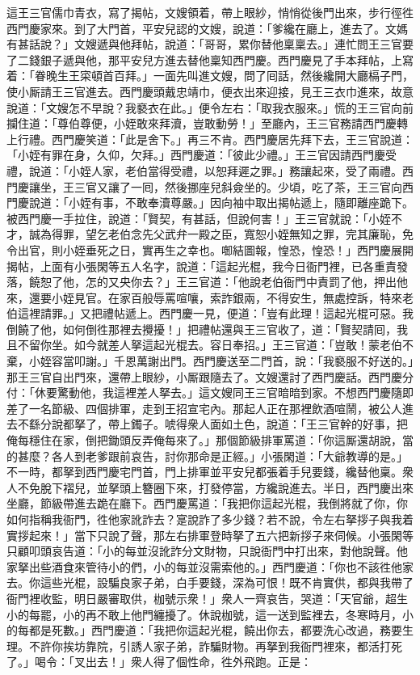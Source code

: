 這王三官儒巾青衣，寫了揭帖，文嫂領着，帶上眼紗，悄悄從後門出來，步行徑徃西門慶家來。到了大門首，平安兒認的文嫂，說道：「爹纔在廳上，進去了。文媽有甚話說？」文嫂遞與他拜帖，說道：「哥哥，累你替他稟稟去。」連忙問王三官要了二錢銀子遞與他，那平安兒方進去替他稟知西門慶。西門慶見了手本拜帖，上寫着：「眷晚生王寀頓首百拜。」一面先叫進文嫂，問了囘話，然後纔開大廳槅子門，使小厮請王三官進去。西門慶頭戴忠靖巾，便衣出來迎接，見王三衣巾進來，故意說道：「文嫂怎不早說？我褻衣在此。」便令左右：「取我衣服來。」慌的王三官向前攔住道：「尊伯尊便，小姪敢來拜瀆，豈敢動勞！」至廳內，王三官務請西門慶轉上行禮。西門慶笑道：「此是舍下。」再三不肯。西門慶居先拜下去，王三官說道：「小姪有罪在身，{}久仰，欠拜。」西門慶道：「彼此少禮。」王三官因請西門慶受禮，說道：「小姪人家，老伯當得受禮，以恕拜遲之罪。」務讓起來，受了兩禮。西門慶讓坐，王三官又讓了一囘，然後挪座兒斜僉坐的。少頃，吃了茶，王三官向西門慶說道：「小姪有事，不敢奉瀆尊嚴。」因向袖中取出揭帖遞上，隨即離座跪下。被西門慶一手拉住，說道：「賢契，{}有甚話，但說何害！」王三官就說：「小姪不才，誠為得罪，望乞老伯念先父武弁一殿之臣，寬恕小姪無知之罪，完其廉恥，免令出官，則小姪垂死之日，實再生之幸也。啣結圖報，惶恐，惶恐！」西門慶展開揭帖，上面有小張閑等五人名字，說道：「這起光棍，我今日衙門裡，已各重責發落，饒恕了他，怎的又央你去？」王三官道：「他說老伯衙門中責罰了他，押出他來，還要小姪見官。在家百般辱罵喧嚷，索詐銀兩，不得安生，無處控訴，特來老伯這裡請罪。」又把禮帖遞上。西門慶一見，便道：「豈有此理！這起光棍可惡。我倒饒了他，如何倒徃那裡去攪擾！」把禮帖還與王三官收了，道：「賢契請囘，我且不留你坐。如今就差人拏這起光棍去。容日奉招。」王三官道：「豈敢！蒙老伯不棄，小姪容當叩謝。」千恩萬謝出門。西門慶送至二門首，說：「我褻服不好送的。」那王三官自出門來，還帶上眼紗，小厮跟隨去了。文嫂還討了西門慶話。西門慶分付：「休要驚動他，我這裡差人拏去。」這文嫂同王三官暗暗到家。不想西門慶隨即差了一名節級、四個排軍，走到王招宣宅內。那起人正在那裡飲酒喧鬧，被公人進去不繇分說都拏了，帶上鐲子。唬得衆人面如土色，說道：「王三官幹的好事，把俺每穩住在家，倒把鋤頭反弄俺每來了。」{}那個節級排軍罵道：「你這厮還胡說，當的甚麼？各人到老爹跟前哀告，討你那命是正經。」小張閑道：「大爺教導的是。」不一時，都拏到西門慶宅門首，門上排軍並平安兒都張着手兒要錢，纔替他稟。衆人不免脫下褶兒，並拏頭上簪圈下來，打發停當，方纔說進去。半日，西門慶出來坐廳，節級帶進去跪在廳下。西門慶罵道：「我把你這起光棍，我倒將就了你，你如何指稱我衙門，徃他家訛詐去？寔說詐了多少錢？若不說，令左右拏拶子與我着實拶起來！」當下只說了聲，那左右排軍登時拏了五六把新拶子來伺候。小張閑等只顧叩頭哀告道：「小的每並沒訛詐分文財物，只說衙門中打出來，對他說聲。他家拏出些酒食來管待小的們，小的每並沒需索他的。」{}西門慶道：「你也不該徃他家去。你這些光棍，設騙良家子弟，白手要錢，深為可恨！既不肯實供，都與我帶了衙門裡收監，明日嚴審取供，枷號示衆！」衆人一齊哀告，哭道：「天官爺，超生小的每罷，小的再不敢上他門纏擾了。休說枷號，這一送到監裡去，冬寒時月，小的每都是死數。」西門慶道：「我把你這起光棍，饒出你去，都要洗心改過，務要生理。不許你挨坊靠院，引誘人家子弟，詐騙財物。{}再拏到我衙門裡來，都活打死了。」喝令：「叉出去！」衆人得了個性命，徃外飛跑。正是：

